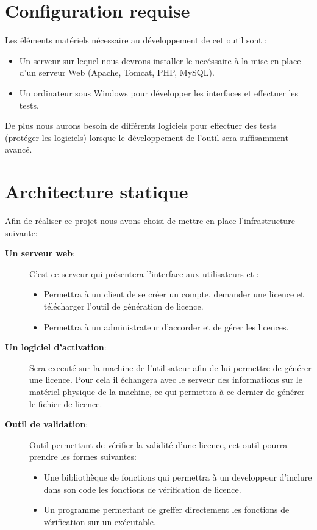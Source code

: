 \chapter{Configuration requise}

Les éléments matériels nécessaire au développement de cet outil sont :
\begin{itemize}
    \item Un serveur sur lequel nous devrons installer le necéssaire à la mise en place d'un
        serveur Web (Apache, Tomcat, PHP, MySQL).
    \item Un ordinateur sous Windows pour développer les interfaces et effectuer les tests.
\end{itemize}

De plus nous aurons besoin de différents logiciels pour effectuer des tests (protéger les
logiciels) lorsque le développement de l'outil sera suffisamment avancé.

\chapter{Architecture statique}
Afin de réaliser ce projet nous avons choisi de mettre en place l'infrastructure suivante:

\begin{description}
	\item[\textbf{Un serveur web}:]
		C'est ce serveur qui présentera l'interface aux utilisateurs et :
		\begin{itemize}
			\item Permettra à un client de se créer un compte, demander une licence et 
			télécharger l'outil de génération de licence.
			\item Permettra à un administrateur d'accorder et de gérer les licences. 
		\end{itemize}
	\item[\textbf{Un logiciel d'activation}:] 
		Sera executé sur la machine de l'utilisateur
		afin de lui permettre de générer une licence. Pour cela il échangera avec
		le serveur des informations sur le matériel physique de la machine, ce 
		qui permettra à ce dernier de générer le fichier de licence.
	\item[\textbf{Outil de validation}:]
		Outil permettant de vérifier la validité d'une licence, cet outil
		pourra prendre les formes suivantes: 
		\begin{itemize}
		\item Une bibliothèque de fonctions qui permettra à un developpeur d'inclure
		dans son code les fonctions de vérification de licence. 
		\item Un programme permettant de greffer directement les fonctions de vérification
		sur un exécutable. 
		\end{itemize}
\end{description}

